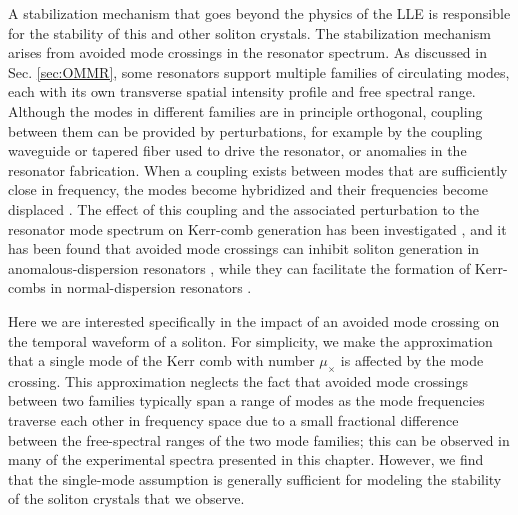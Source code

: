 A stabilization mechanism that goes beyond the physics of the LLE is responsible for the stability of this and other soliton crystals. The stabilization mechanism arises from avoided mode crossings in the resonator spectrum. As discussed in Sec. \ref{sec:OMMR}, some resonators support multiple families of circulating modes, each with its own transverse spatial intensity profile and free spectral range. Although the modes in different families are in principle orthogonal, coupling between them can be provided by perturbations, for example by the coupling waveguide or tapered fiber used to drive the resonator, or anomalies in the resonator fabrication. When a coupling exists between modes that are sufficiently close in frequency, the modes become hybridized and their frequencies become displaced \cite{Haus1991}. The effect of this coupling and the associated perturbation to the resonator mode spectrum on Kerr-comb generation has been investigated \cite{Savchenkov2012}, and it has been found that avoided mode crossings can inhibit soliton generation in anomalous-dispersion resonators \cite{Herr2014a,Yi2015}, while they can facilitate the formation of Kerr-combs in normal-dispersion resonators \cite{Liu2014a,Xue2015,Bao2017}. 



Here we are interested specifically in the impact of an avoided mode crossing on the temporal waveform of a soliton. For simplicity, we make the approximation that a single mode of the Kerr comb with number $\mu_\times$ is affected by the mode crossing. This approximation neglects the fact that avoided mode crossings between two families typically span a range of modes as the mode frequencies traverse each other in frequency space due to a small fractional difference between the free-spectral ranges of the two mode families; this can be observed in many of the experimental spectra presented in this chapter. However, we find that the single-mode assumption is generally sufficient for modeling the stability of the soliton crystals that we observe.

